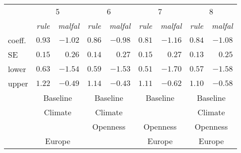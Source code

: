  \begin{tabular}{lrrrrrrrr}
\hline \hline 
& \multicolumn{2}{c}{5} & \multicolumn{2}{c}{6} & \multicolumn{2}{c}{7} & \multicolumn{2}{c}{8}\\ 
& \multicolumn{1}{c}{\emph{rule}} & \multicolumn{1}{c}{\emph{malfal}} & \multicolumn{1}{c}{\emph{rule}} & \multicolumn{1}{c}{\emph{malfal}} & \multicolumn{1}{c}{\emph{rule}} & \multicolumn{1}{c}{\emph{malfal}} & \multicolumn{1}{c}{\emph{rule}} & \multicolumn{1}{c}{\emph{malfal}}\\ 
 \hline 
 
coeff. & $0.93$ & $-1.02$ & $0.86$ & $-0.98$ & $0.81$ & $-1.16$ & $0.84$ & $-1.08$\\ 
SE & $0.15$ & $0.26$ & $0.14$ & $0.27$ & $0.15$ & $0.27$ & $0.13$ & $0.25$\\ 
lower & $0.63$ & $-1.54$ & $0.59$ & $-1.53$ & $0.51$ & $-1.70$ & $0.57$ & $-1.58$\\ 
upper & $1.22$ & $-0.49$ & $1.14$ & $-0.43$ & $1.11$ & $-0.62$ & $1.10$ & $-0.58$\\ 
& \multicolumn{2}{c}{Baseline} & \multicolumn{2}{c}{Baseline} & \multicolumn{2}{c}{Baseline} & \multicolumn{2}{c}{Baseline}\\ 
& \multicolumn{2}{c}{Climate} & \multicolumn{2}{c}{Climate} & \multicolumn{2}{c}{} & \multicolumn{2}{c}{Climate}\\ 
& \multicolumn{2}{c}{} & \multicolumn{2}{c}{Openness} & \multicolumn{2}{c}{Openness} & \multicolumn{2}{c}{Openness}\\ 
& \multicolumn{2}{c}{Europe} & \multicolumn{2}{c}{} & \multicolumn{2}{c}{Europe} & \multicolumn{2}{c}{Europe}\\ 
 \hline
\end{tabular}